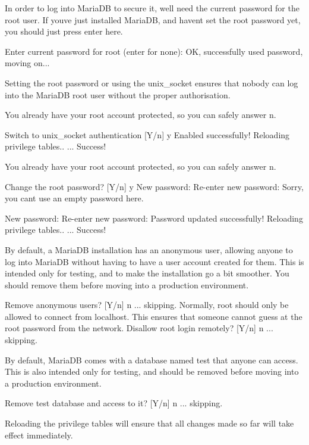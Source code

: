 In order to log into Maria\+DB to secure it, we\textquotesingle{}ll need the current password for the root user. If you\textquotesingle{}ve just installed Maria\+DB, and haven\textquotesingle{}t set the root password yet, you should just press enter here.

Enter current password for root (enter for none)\+: OK, successfully used password, moving on...

Setting the root password or using the unix\+\_\+socket ensures that nobody can log into the Maria\+DB root user without the proper authorisation.

You already have your root account protected, so you can safely answer \textquotesingle{}n\textquotesingle{}.

Switch to unix\+\_\+socket authentication \mbox{[}Y/n\mbox{]} y Enabled successfully! Reloading privilege tables.. ... Success!

You already have your root account protected, so you can safely answer \textquotesingle{}n\textquotesingle{}.

Change the root password? \mbox{[}Y/n\mbox{]} y New password\+: Re-\/enter new password\+: Sorry, you can\textquotesingle{}t use an empty password here.

New password\+: Re-\/enter new password\+: Password updated successfully! Reloading privilege tables.. ... Success!

By default, a Maria\+DB installation has an anonymous user, allowing anyone to log into Maria\+DB without having to have a user account created for them. This is intended only for testing, and to make the installation go a bit smoother. You should remove them before moving into a production environment.

Remove anonymous users? \mbox{[}Y/n\mbox{]} n ... skipping. Normally, root should only be allowed to connect from \textquotesingle{}localhost\textquotesingle{}. This ensures that someone cannot guess at the root password from the network. Disallow root login remotely? \mbox{[}Y/n\mbox{]} n ... skipping.

By default, Maria\+DB comes with a database named \textquotesingle{}test\textquotesingle{} that anyone can access. This is also intended only for testing, and should be removed before moving into a production environment.

Remove test database and access to it? \mbox{[}Y/n\mbox{]} n ... skipping.

Reloading the privilege tables will ensure that all changes made so far will take effect immediately.

